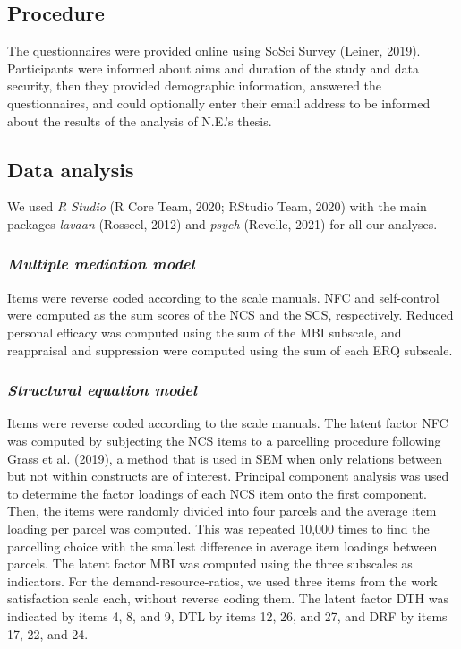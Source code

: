 \documentclass[
  english,
  man]{apa6}
\begin{document}
\hypertarget{procedure}{%
\subsection{Procedure}\label{procedure}}

The questionnaires were provided online using SoSci Survey (Leiner, 2019).
Participants were informed about aims and duration of the study and data security, then they provided demographic information, answered the questionnaires, and could optionally enter their email address to be informed about the results of the analysis of N.E.'s thesis.

\hypertarget{data-analysis}{%
\subsection{Data analysis}\label{data-analysis}}

We used \emph{R Studio} (R Core Team, 2020; RStudio Team, 2020) with the main packages \emph{lavaan} (Rosseel, 2012) and \emph{psych} (Revelle, 2021) for all our analyses.

\hypertarget{multiple-mediation-model}{%
\subsubsection{\texorpdfstring{\emph{Multiple mediation model}}{Multiple mediation model}}\label{multiple-mediation-model}}

Items were reverse coded according to the scale manuals.
NFC and self-control were computed as the sum scores of the NCS and the SCS, respectively.
Reduced personal efficacy was computed using the sum of the MBI subscale, and reappraisal and suppression were computed using the sum of each ERQ subscale.

\hypertarget{structural-equation-model}{%
\subsubsection{\texorpdfstring{\emph{Structural equation model}}{Structural equation model}}\label{structural-equation-model}}

Items were reverse coded according to the scale manuals.
The latent factor NFC was computed by subjecting the NCS items to a parcelling procedure following Grass et al. (2019), a method that is used in SEM when only relations between but not within constructs are of interest.
Principal component analysis was used to determine the factor loadings of each NCS item onto the first component.
Then, the items were randomly divided into four parcels and the average item loading per parcel was computed.
This was repeated 10,000 times to find the parcelling choice with the smallest difference in average item loadings between parcels.
The latent factor MBI was computed using the three subscales as indicators.
For the demand-resource-ratios, we used three items from the work satisfaction scale each, without reverse coding them.
The latent factor DTH was indicated by items 4, 8, and 9, DTL by items 12, 26, and 27, and DRF by items 17, 22, and 24.
\end{document}
